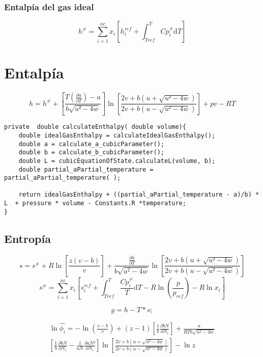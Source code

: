 \subsubsection{Entalpía del gas ideal}
\begin{equation}\label{eq:idealgasenthalpy}
h^{\neq} = \sum_{i=1}^{nc} x_i \left[ h_i^{ref} + \int_{Tref}^{T} Cp_i^{\neq} \mathrm{d}T \right]
\end{equation}

\section{Entalpía}
\begin{equation}\label{eq:enthalpy}
h = h^{\neq} + \left[ \frac{T(\frac{\partial a}{\partial T}) - a}{b\sqrt{u²-4w} }\right] 
\ln\left[\frac{2v+b\left(u + \sqrt{u²-4w}\right)}{2v+b\left(u - \sqrt{u²-4w}\right)}\right]
+ pv - RT
\end{equation}

\begin{lstlisting}[label=some-code,caption=Some Code]
private  double calculateEnthalpy( double volume){
    double idealGasEnthalpy = calculateIdealGasEnthalpy();
    double a = calculate_a_cubicParameter();
    double b = calculate_b_cubicParameter();
    double L = cubicEquationOfState.calculateL(volume, b);
    double partial_aPartial_temperature = partial_aPartial_temperature( );
    
    return idealGasEnthalpy + ((partial_aPartial_temperature - a)/b) * L  + pressure * volume - Constants.R *temperature;
}
\end{lstlisting}	



\subsection{Entropía}
\begin{equation}
s = s^{\neq} + R\ln\left[\frac{z(v-b)}{v}\right] + \frac{\frac{\partial a}{\partial T}}{b \sqrt{u^2 - 4w}}
\ln\left[\frac{2v+b\left(u + \sqrt{u²-4w}\right)}{2v+b\left(u - \sqrt{u²-4w}\right)}\right]
\end{equation}
\begin{equation}
s^{\neq} = \sum_{i=1}^{nc} x_i\left[s_i^{ref} + \int_{Tref}^T \frac{Cp_i^{\neq}}{T} \mathrm{d}T 
- R\ln \left(\frac{p}{p_{ref}}\right)- R\ln{x_i}
\right]
\end{equation}


\begin{equation}\label{eq:gibbs}
g = h - T * s;
\end{equation}


\begin{multline}\label{eq:fugacity}
\ln\hat{\phi_i} = - \ln\left(\frac{v-b}{v}\right) 
+ (z-1)\left[\frac{1}{b}\frac{\partial bN}{\partial N_i}\right]
+ \frac{a}{RTb\sqrt{u^2-4w}}
\\
\left[\frac{1}{b}\frac{\partial bN}{\partial N_i}
- \frac{1}{aN}\frac{\partial aN²}{\partial N_i}\right]
\ln\left[\frac{2v+b\left(u + \sqrt{u²-4w}\right)}{2v+b\left(u - \sqrt{u²-4w}\right)}\right]
-\ln{z}
\end{multline}